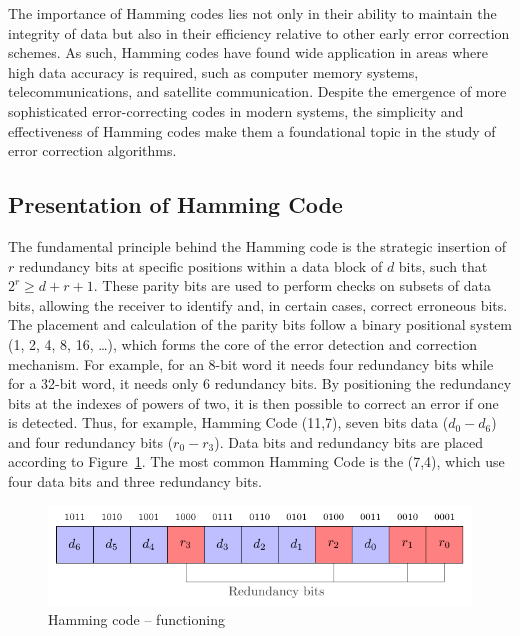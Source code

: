 The importance of Hamming codes lies not only in their ability to maintain the integrity of data but also in their efficiency relative to other early error correction schemes. As such, Hamming codes have found wide application in areas where high data accuracy is required, such as computer memory systems, telecommunications, and satellite communication. Despite the emergence of more sophisticated error-correcting codes in modern systems, the simplicity and effectiveness of Hamming codes make them a foundational topic in the study of error correction algorithms.

\subsection{Presentation of Hamming Code}

The fundamental principle behind the Hamming code is the strategic insertion of $r$ redundancy bits at specific positions within a data block of $d$ bits, such that \(2^r \geqslant d + r + 1\).
These parity bits are used to perform checks on subsets of data bits, allowing the receiver to identify and, in certain cases, correct erroneous bits. The placement and calculation of the parity bits follow a binary positional system (1, 2, 4, 8, 16, \ldots), which forms the core of the error detection and correction mechanism. For example, for an 8-bit word it needs four redundancy bits while for a 32-bit word, it needs only 6 redundancy bits. By positioning the redundancy bits at the indexes of powers of two, it is then possible to correct an error if one is detected. Thus, for example, Hamming Code (11,7), seven bits data ($d_{0}-d_{6}$) and four redundancy bits ($r_{0}-r_{3}$). Data bits and redundancy bits are placed according to Figure~\ref{fig:hamming_functionning}. The most common Hamming Code is the (7,4), which use four data bits and three redundancy bits.

\begin{figure}[ht]
    \centering
    \includegraphics[page=1]{c5_countermeasures_dift/img/hamming_bit.pdf}
    \caption{Hamming code -- functioning}
    \label{fig:hamming_functionning}
\end{figure}

